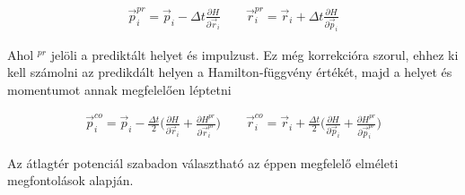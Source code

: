 \documentclass[a4paper,12pt]{article}
\begin{document}
\begin{gather}
	\vec{p}^{pr}_{i} = \vec{p}_{i} - \Delta t \frac{\partial H}{\partial \vec{r}_{i}} \quad \quad \vec{r}^{pr}_{i} = \vec{r}_{i} + \Delta t \frac{\partial H}{\partial \vec{p}_{i}}
\end{gather}

\par Ahol $^{pr}$ jelöli a prediktált helyet és impulzust. Ez még korrekcióra szorul, ehhez ki kell számolni az predikdált helyen a Hamilton-függvény értékét, majd a helyet és momentumot annak megfelelően léptetni

\begin{gather}
	\vec{p}^{co}_{i} = \vec{p}_{i} - \frac{\Delta t}{2} \Big(\frac{\partial H}{\partial \vec{r}_{i}} + \frac{\partial H^{pr}}{\partial \vec{r}_{i}^{pr}} \Big) \quad \quad \vec{r}^{co}_{i} = \vec{r}_{i} + \frac{\Delta t}{2} \Big( \frac{\partial H}{\partial \vec{p}_{i}} + \frac{\partial H^{pr}}{\partial \vec{p}_{i}^{pr}} \Big)
\end{gather}

\par Az átlagtér potenciál szabadon választható az éppen megfelelő elméleti megfontolások alapján. 
\end{document}
